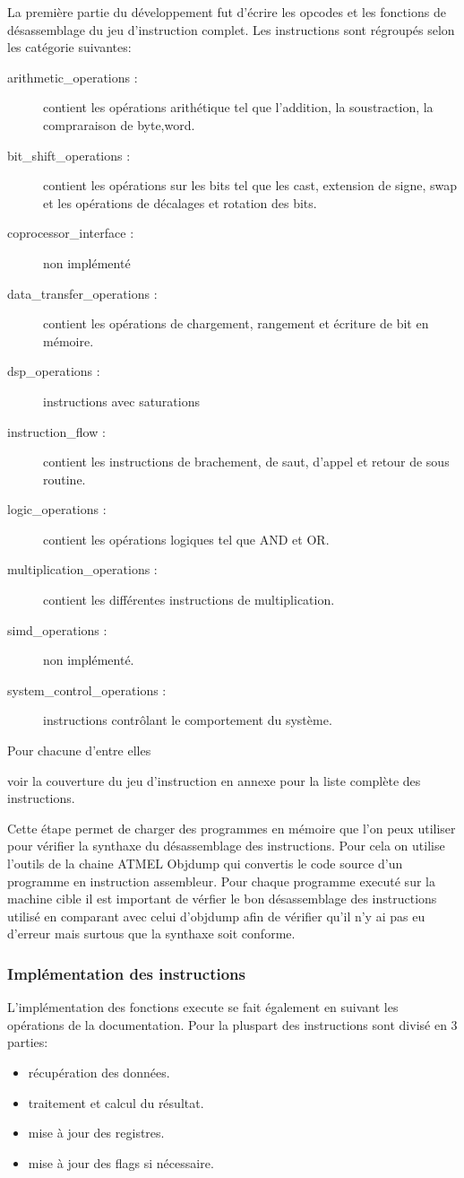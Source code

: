 La première partie du développement fut d'écrire les opcodes et les fonctions de désassemblage du jeu d'instruction complet.
Les instructions sont régroupés selon les catégorie suivantes:

\begin{description}
\item[arithmetic\_operations :] contient les opérations arithétique tel que l'addition, la soustraction, la compraraison de byte,word.
\item[bit\_shift\_operations :] contient les opérations sur les bits tel que les cast, extension de signe, swap et les opérations de décalages et rotation des bits.
\item[coprocessor\_interface :] non implémenté
\item[data\_transfer\_operations :] contient les opérations de chargement, rangement et écriture de bit en mémoire.
\item[dsp\_operations :] instructions avec saturations
\item[instruction\_flow :] contient les instructions de brachement, de saut, d'appel et retour de sous routine.
\item[logic\_operations :] contient les opérations logiques tel que AND et OR. 
\item[multiplication\_operations :] contient les différentes instructions de multiplication.
\item[simd\_operations :] non implémenté. 
\item[system\_control\_operations :] instructions contrôlant le comportement du système.
\end{description}

Pour chacune d'entre elles 

voir la couverture du jeu d'instruction en annexe pour la liste complète des instructions.

Cette étape permet de charger des programmes en mémoire que l'on peux utiliser pour vérifier la synthaxe du désassemblage des instructions. 
Pour cela on utilise l'outils de la chaine ATMEL Objdump qui convertis le code source d'un programme en instruction assembleur. 
Pour chaque programme executé sur la machine cible il est important de vérfier le bon désassemblage des instructions utilisé en comparant avec celui d'objdump
afin de vérifier qu'il n'y ai pas eu d'erreur mais surtous que la synthaxe soit conforme.

\subsubsection{Implémentation des instructions}
L'implémentation des fonctions execute se fait également en suivant les opérations de la documentation. Pour la pluspart des instructions sont divisé en 3 parties:
\begin{itemize}
\item récupération des données.
\item traitement et calcul du résultat.
\item mise à jour des registres.
\item mise à jour des flags si nécessaire.
\end{itemize}
 

